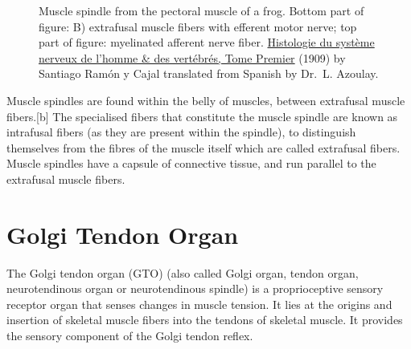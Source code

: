 \begin{figure}
{}

\caption{Muscle spindle from the pectoral muscle of a frog. Bottom part of figure: B) extrafusal muscle fibers with efferent motor nerve; top part of figure: myelinated afferent nerve fiber. \href{https://wellcomelibrary.org/item/b2129592x\#?c=0\&m=0\&s=0\&cv=14\&z=0\%2C-3.48\%2C1\%2C8.6591}{Histologie du système nerveux de l'homme \& des vertébrés, Tome Premier} (1909) by Santiago Ramón y Cajal translated from Spanish by Dr.~L. Azoulay.}\label{fig:musclespindle}
\end{figure}

Muscle spindles are found within the belly of muscles, between extrafusal muscle fibers.{[}b{]} The specialised fibers that constitute the muscle spindle are known as intrafusal fibers (as they are present within the spindle), to distinguish themselves from the fibres of the muscle itself which are called extrafusal fibers. Muscle spindles have a capsule of connective tissue, and run parallel to the extrafusal muscle fibers.

\hypertarget{golgi-tendon-organ}{%
\section{Golgi Tendon Organ}\label{golgi-tendon-organ}}

The Golgi tendon organ (GTO) (also called Golgi organ, tendon organ, neurotendinous organ or neurotendinous spindle) is a proprioceptive sensory receptor organ that senses changes in muscle tension. It lies at the origins and insertion of skeletal muscle fibers into the tendons of skeletal muscle. It provides the sensory component of the Golgi tendon reflex.



